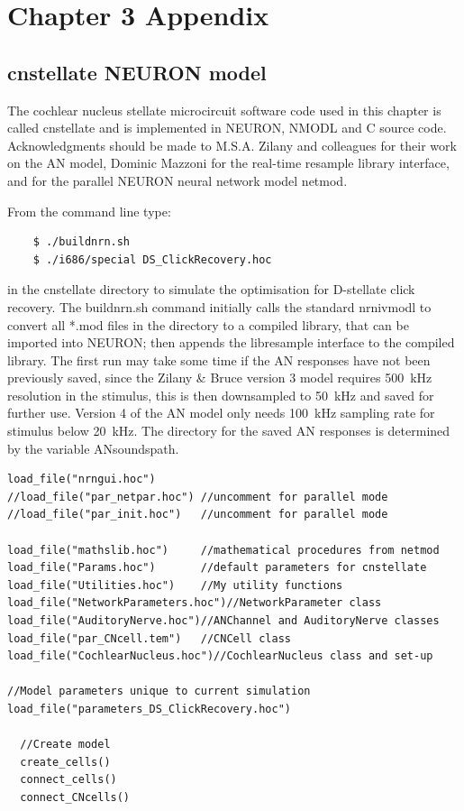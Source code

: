 \graphicspath{{../figures/}{./gfx/}{/media/data/Work/cnstellate/}{/media/data/Work/cnstellate/Responses/}}

\chapter{Chapter 3 Appendix}\label{sec:ch3appendix}
\section{\textsf{cnstellate} NEURON model}

The cochlear nucleus stellate microcircuit software code used in this chapter is
called \textsf{cnstellate} and is implemented in NEURON, NMODL and C source
code. Acknowledgments should be made to M.S.A. Zilany and colleagues for their
work on the AN model, Dominic Mazzoni for the real-time resample library
interface, and \citet{MiglioreCanniaEtAl:2006} for the parallel NEURON
neural network model \textsf{netmod}.

From the command line type:
\begin{verbatim}
    $ ./buildnrn.sh
    $ ./i686/special DS_ClickRecovery.hoc
\end{verbatim}
in the \textsf{cnstellate} directory to simulate the optimisation for D-stellate
click recovery.  The \textsf{buildnrn.sh} command initially calls the standard
\textsf{nrnivmodl} to convert all *.mod files in the directory to a compiled
library, that can be imported into NEURON; then appends the libresample
interface to the compiled library. The 
first run may take some time if the AN
responses have not been previously saved, since the Zilany \& Bruce version 3
model requires 500~kHz resolution in the stimulus, this is then downsampled to
50~kHz and saved for further use. Version 4 of the AN model
\citep{ZilanyBruceEtAl:2009} only needs 100~kHz sampling rate for stimulus below
20~kHz. The directory for the saved AN responses is determined by the variable
\textsf{ANsoundspath}.

\begin{lstlisting}[label=lst:headerlines,caption={Headerlines in \mbox{\textsf{DS\_Recover\.hoc}} show a typical setup in a \textsf{cnstellate} setup.}]
load_file("nrngui.hoc")
//load_file("par_netpar.hoc") //uncomment for parallel mode
//load_file("par_init.hoc")   //uncomment for parallel mode

load_file("mathslib.hoc")     //mathematical procedures from netmod
load_file("Params.hoc")       //default parameters for cnstellate  
load_file("Utilities.hoc")    //My utility functions 
load_file("NetworkParameters.hoc")//NetworkParameter class
load_file("AuditoryNerve.hoc")//ANChannel and AuditoryNerve classes 
load_file("par_CNcell.tem")   //CNCell class
load_file("CochlearNucleus.hoc")//CochlearNucleus class and set-up

//Model parameters unique to current simulation
load_file("parameters_DS_ClickRecovery.hoc") 

  //Create model
  create_cells()
  connect_cells()
  connect_CNcells()
\end{lstlisting}


